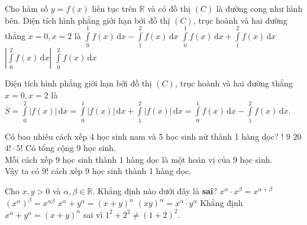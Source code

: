 \begin{ex}%
	Cho hàm số $y=f(x)$ liên tục trên $\mathbb{R}$ và có đồ thị $(C)$ là đường cong như hình bên. Diện tích hình phẳng giới hạn bởi đồ thị $(C)$, trục hoành và hai đường thẳng $x=0,x=2$ là
\immini
{
\choice
{\True $\displaystyle\int\limits_0^1f(x)\mathrm{\, d}x-\displaystyle\int\limits_1^2f(x)\mathrm{\, d}x$}
{$\displaystyle\int\limits_0^1f(x)\mathrm{\, d}x+\displaystyle\int\limits_1^2f(x)\mathrm{\, d}x$}
{$\left|\displaystyle\int\limits_0^2f(x)\mathrm{\, d}x\right|$}
{$\displaystyle\int\limits_0^2f(x)\mathrm{\, d}x$}
}
{
}
\loigiai
{
Diện tích hình phẳng giới hạn bởi đồ thị $(C)$, trục hoành và hai đường thẳng $x=0,x=2$ là $S=\displaystyle\int\limits_0^2\left|f(x)\right|\mathrm{\, d}x=\displaystyle\int\limits_0^1\left|f(x)\right|\mathrm{\, d}x+\displaystyle\int\limits_1^2\left|f(x)\right|\mathrm{\, d}x=\displaystyle\int\limits_0^1f(x)\mathrm{\, d}x-\displaystyle\int\limits_1^2f(x)\mathrm{\, d}x$.
}
\end{ex}

\begin{ex}%
Có bao nhiêu cách xếp 4 học sinh nam và 5 học sinh nữ thành 1 hàng dọc?
\choice
{!}
{$9$}
{$20$}
{$4!\cdot 5$!}
\loigiai
{
Có tổng cộng $9$ học sinh.\\
Mỗi cách xếp $9$ học sinh thành $1$ hàng dọc là một hoán vị của $9$ học sinh.\\
Vậy ta có $9!$ cách xếp $9$ học sinh thành 1 hàng dọc.
}
\end{ex}

\begin{ex}%
Cho $x,y>0$ và $\alpha,\beta\in\mathbb{R}$. Khẳng định nào dưới đây là \textbf{sai}?
\choice
{$x^{\alpha}\cdot x^{\beta}=x^{\alpha+\beta}$}
{$\left(x^{\alpha}\right)^{\beta}=x^{\alpha\beta}$}
{\True $x^{\alpha}+y^{\alpha}=(x+y)^{\alpha}$}
{$(x y)^{\alpha}=x^{\alpha}\cdot y^{\alpha}$}
\loigiai
{
Khẳng định $x^{\alpha}+y^{\alpha}=(x+y)^{\alpha}$ sai vì $1^2+2^2\ne (1+2)^2$.
}
\end{ex}

